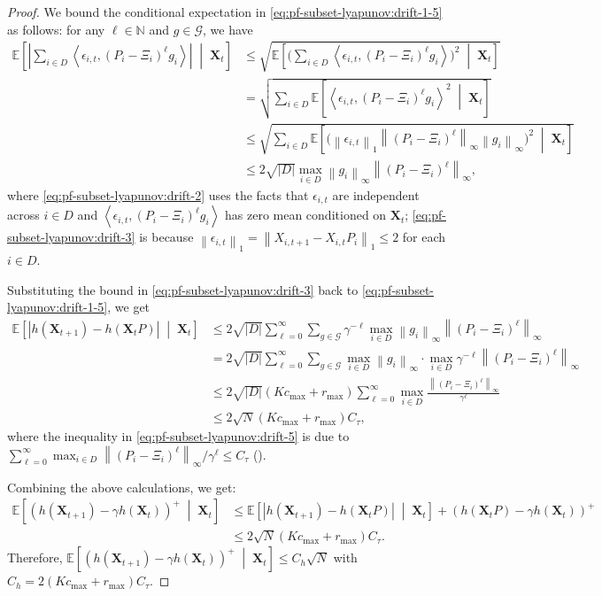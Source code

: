 \documentclass{article}
\theoremstyle{plain}
\theoremstyle{remark}
\newcommand{\norm}[1]{\left\lVert#1\right\rVert}
\newcommand{\E}[1]{\mathbb{E}\left[#1\right]}
\newcommand{\givenmiddle}{\;\middle|\;}
\newcommand{\abs}[1]{\left\lvert#1\right\rvert}
\newcommand{\sumell}{\sum_{\ell=0}^\infty}
\newcommand{\Ctau}{C_\tau}
\def\mX{{\bm{X}}}
\newcommand{\EE}{\mathbb{E}}
\newcommand{\innerproduct}[2]{\left\langle #1, #2 \right\rangle}
\newcommand{\bracket}[1]{\left(#1\right)}
\newcommand{\mbracket}[1]{\left[#1\right]}
\begin{document}
\begin{proof}
We bound the conditional expectation in \eqref{eq:pf-subset-lyapunov:drift-1-5} as follows: for any $\ell \in \mathbb{N}$ and $g\in \mathcal{G}$, we have
\begin{align}
    \E{\abs{\sum_{i\in D}\innerproduct{\epsilon_{i,t}}{(P_i-\Xi_i)^{\ell}g_i}} \givenmiddle \mX_t}
    \nonumber
    &\leq \sqrt{\E{\bigg(\sum_{i\in D}\innerproduct{\epsilon_{i,t}}{(P_i-\Xi_i)^{\ell}g_i}\bigg)^2 \givenmiddle \mX_t}}  \\
    \label{eq:pf-subset-lyapunov:drift-2}
    &= \sqrt{\sum_{i\in D}\E{\innerproduct{\epsilon_{i,t}}{(P_i-\Xi_i)^{\ell}g_i}^2 \givenmiddle \mX_t}} \\
    \nonumber
    &\leq  \sqrt{\sum_{i\in D}\E{\Big(\norm{\epsilon_{i,t}}_1 \norm{(P_i-\Xi_i)^{\ell}}_\infty \norm{g_i}_\infty\Big)^2 \givenmiddle \mX_t}} \\
    \label{eq:pf-subset-lyapunov:drift-3}
    &\leq 2 \sqrt{\abs{D}} \max_{i\in D} \norm{g_i}_{\infty}\norm{(P_i-\Xi_i)^{\ell}}_{\infty},
\end{align}
where \eqref{eq:pf-subset-lyapunov:drift-2} uses the facts that $\epsilon_{i,t}$ are independent across $i\in D$ and $\innerproduct{\epsilon_{i,t}}{(P_i-\Xi_i)^{\ell}g_i}$ has zero mean conditioned on $\mX_t$; \eqref{eq:pf-subset-lyapunov:drift-3} is because $\norm{\epsilon_{i,t}}_1 = \norm{X_{i,t+1}-X_{i,t}P_i}_1 \leq 2$ for each $i\in D$. 

Substituting the bound in \eqref{eq:pf-subset-lyapunov:drift-3} back to  \eqref{eq:pf-subset-lyapunov:drift-1-5}, we get 
\begin{align}
    \nonumber \EE\mbracket{\abs{h(\mX_{t+1})-h(\mX_tP)}\givenmiddle\mX_t}
    &\leq 2\sqrt{\abs{D}} \sumell \sum_{g\in \mathcal{G}}  \gamma^{-\ell} \max_{i\in D}  \norm{g_i}_{\infty} \norm{(P_i-\Xi_i)^{\ell}}_{\infty} \\
    \nonumber
    &= 2\sqrt{\abs{D}} \sumell \sum_{g\in \mathcal{G}}   \max_{i\in D}  \norm{g_i}_{\infty} \cdot \max_{i\in D} \gamma^{-\ell}\norm{(P_i-\Xi_i)^{\ell}}_{\infty} \\
    \nonumber
    &\leq 2\sqrt{\abs{D}}  (Kc_{\max} + r_{\max}) \sumell \max_{i\in D}\frac{\norm{(P_i-\Xi_i)^{\ell}}_{\infty}}{\gamma^{\ell}} \\
     \label{eq:pf-subset-lyapunov:drift-5}
    &\leq 2\sqrt{N} (Kc_{\max} + r_{\max}) \Ctau,
\end{align}
where the inequality in \eqref{eq:pf-subset-lyapunov:drift-5} is due to $\sumell \max_{i\in D} \norm{(P_i-\Xi_i)^{\ell}}_{\infty} / \gamma^{\ell} \leq \Ctau$ (). 



Combining the above calculations, we get:
\begin{align*}
    \EE\mbracket{\bracket{h(\mX_{t+1})-\gamma h(\mX_t)}^+\givenmiddle\mX_t} &\leq \EE\mbracket{\abs{h(\mX_{t+1})-h(\mX_tP)}\givenmiddle\mX_t}+ \bracket{h(\mX_tP)-\gamma h(\mX_t)}^+\\
    &\leq 2\sqrt{N} (Kc_{\max} + r_{\max}) \Ctau. 
\end{align*}
Therefore, $\EE\mbracket{\bracket{h(\mX_{t+1})-\gamma h(\mX_t)}^+\givenmiddle\mX_t}\leq C_h \sqrt{N}$ with $C_h = 2(Kc_{\max} + r_{\max}) \Ctau$. 
\end{proof}
\end{document}
